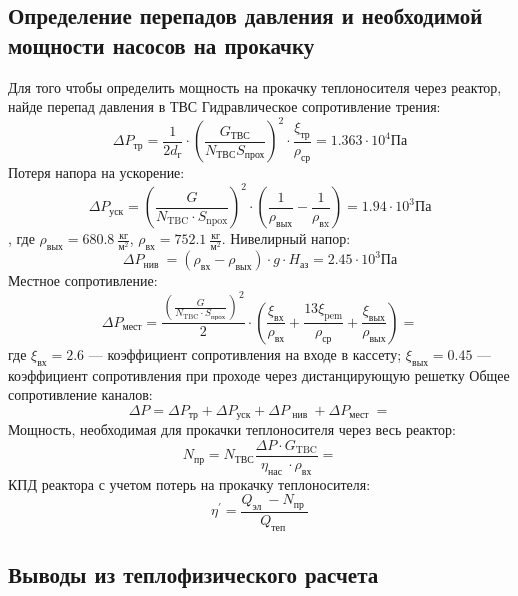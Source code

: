 \subsection{Определение перепадов давления и необходимой мощности насосов на прокачку}
Для того чтобы определить мощность на прокачку теплоносителя через реактор, найде перепад давления в ТВС
Гидравлическое сопротивление трения:
$$
\Delta P_{\text{тр}} = \frac 1 {2 d_{\text{г}}} \cdot \left(\frac {G_{\text{ТВС}}}{N_{\text{ТВС}}S_{\text{прох}}}  \right)^2 \cdot \frac {\xi_{\text{тр}}} {\rho_{\text{ср}}} = 1.363 \cdot 10^4 \text{Па}
$$
Потеря напора на ускорение:
$$
\Delta P_{\mathrm{уск}}=\left(\frac{G}{N_{\mathrm{TBC}} \cdot S_{\mathrm{npox}}}\right)^{2} \cdot\left(\frac{1}{\rho_{\mathrm{вых}}}-\frac{1}{\rho_{\mathrm{вx}}}\right) = 1.94 \cdot 10^3 \text{Па}
$$, где $\rho_{\text{вых}} = 680.8\  \frac {\text{кг}}{\text{м}^2} $, $\rho_{\text{вх}} =752.1\  \frac {\text{кг}}{\text{м}^2}$.
Нивелирный напор:
$$
\Delta P_{\text {нив }}=\left(\rho_{\text{вх}}-\rho_{\text{вых}}\right) \cdot g \cdot H_{\text{аз}}=2.45 \cdot 10^{3} \text{Па}
$$
Местное сопротивление:
$$
\Delta P_{\mathrm{мест}}=\frac{\left(\frac{G}{N_{\mathrm{TBC}} \cdot S_{\mathrm{прох}}}\right)^{2}}{2} \cdot\left(\frac{\xi_{\mathrm{вх}}}{\rho_{\mathrm{вх}}}+\frac{13 \xi_{\mathrm{pem}}}{\rho_{\mathrm{ср}}}+\frac{\xi_{\mathrm{вых}}}{\rho_{\mathrm{вых}}}\right)=
$$
где $\xi_{\text{вх}}= 2.6 $ — коэффициент сопротивления на входе в кассету; $\xi_{\text{вых}} = 0.45$ — коэффициент сопротивления при проходе через дистанцирующую решетку %
Общее сопротивление каналов:
$$
\Delta P=\Delta P_{\mathrm{тр}}+\Delta P_{\mathrm{уск}}+\Delta P_{\text { нив }}+\Delta P_{\text {мест }} = 
$$
Мощность, необходимая для прокачки теплоносителя через весь реактор:
$$
N_{\mathrm{пр}}=N_{\mathrm{ТВС}} \frac{\Delta P \cdot G_{\mathrm{TBC}}}{\eta_{\text {нас }} \cdot \rho_{\mathrm{вх}}}=
$$
КПД реактора с учетом потерь на прокачку теплоносителя:
$$
\eta^{\prime}=\frac{Q_{\text {эл }}-N_{\text {пр }}}{Q_{\text {теп }}}
$$

\subsection{Выводы из теплофизического расчета}


